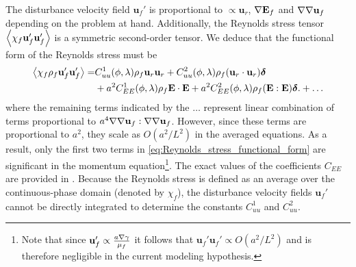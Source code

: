 The disturbance velocity field $\textbf{u}_f'$ is proportional to $\propto \textbf{u}_r$, $\mathbf{\nabla}\textbf{E}_f$ and $\mathbf{\nabla}\mathbf{\nabla} \textbf{u}_f$ depending on the problem at hand.
Additionally, the Reynolds stress tensor $\left<\chi_f \textbf{u}_f'\textbf{u}_f'\right>$ is a symmetric second-order tensor. 
We deduce that the functional form of the Reynolds stress must be 
\begin{align}
    \avg{\chi_f \rho_f \textbf{u}_f' \textbf{u}_f'}
    =&
    C_{uu}^1(\phi,\lambda) \rho_f \textbf{u}_{r} \textbf{u}_{r}
    + C_{uu}^2(\phi,\lambda) \rho_f (\textbf{u}_{r}\cdot  \textbf{u}_{r})\bm\delta\\
    &+a^2 C_{EE}^1(\phi,\lambda) \rho_f\textbf{E}\cdot \textbf{E} 
    +  a^2 C_{EE}^2(\phi,\lambda) \rho_f (\textbf{E} : \textbf{E})\bm\delta.
    + \ldots
    \label{eq:Reynolds_stress_functional_form}
\end{align}
where the remaining terms indicated by the $\ldots$ represent linear combination of terms proportional to $a^4\mathbf{\nabla}\mathbf{\nabla} \textbf{u}_f:\mathbf{\nabla}\mathbf{\nabla} \textbf{u}_f$. 
However, since these terms are proportional to $a^2$, they scale as $O(a^2/L^2)$ in the averaged equations. 
As a result, only the first two terms in \ref{eq:Reynolds_stress_functional_form} are significant in the momentum equation\footnote{
    Note that since $\textbf{u}_f' \propto \frac{a \mathbf{\nabla} \gamma}{\mu_f}$ it follows that $\textbf{u}_f'\textbf{u}_f' \propto O(a^2/L^2)$ and is therefore negligible in the current modeling hypothesis. 
}.
The exact values of the coefficients $C_{EE}$ are provided in \citet{raja2010inertial}. 
Because the Reynolds stress is defined as an average over the continuous-phase domain (denoted by $\chi_f$), the disturbance velocity fields $\textbf{u}_f'$ cannot be directly integrated to determine the constants $C_{uu}^1$ and $C_{uu}^2$. 
